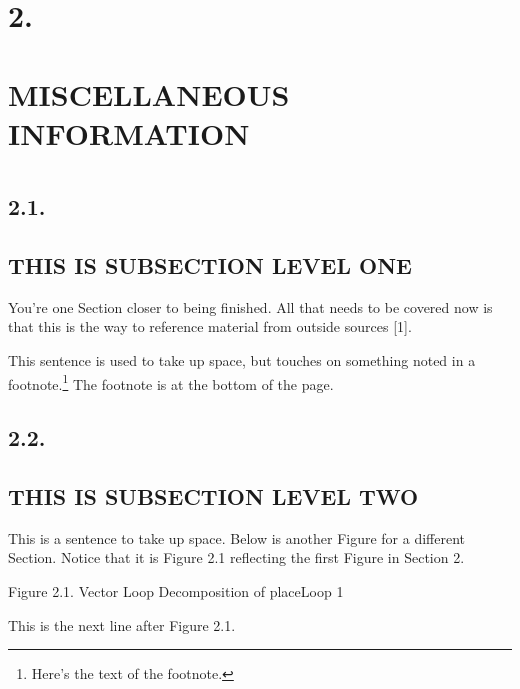 \documentclass{article}
\newcommand{\tab}{\hspace{5mm}}
\begin{document}
\section*{2.\tab }


\section*{MISCELLANEOUS INFORMATION}
\section*{}


\subsection*{2.1.\tab }


\subsection*{
THIS IS SUBSECTION LEVEL ONE}

You're one Section closer to being finished. All that needs to 
be covered now is that this is the way to reference material 
from outside sources [1].


This sentence is used to take up space, but touches on something 
noted in a footnote.\footnote{Here's the text of the footnote.} The 
footnote is at the bottom of the page.




\subsection*{2.2.\tab }


\subsection*{
THIS IS SUBSECTION LEVEL TWO}

This is a sentence to take up space. Below is another Figure 
for a different Section. Notice that it is Figure 2.1 reflecting 
the first Figure in Section 2.





\begin{center}
Figure 2.1. Vector Loop Decomposition of placeLoop 1


\end{center}


This is the next line after Figure 2.1.\\
\end{document}
